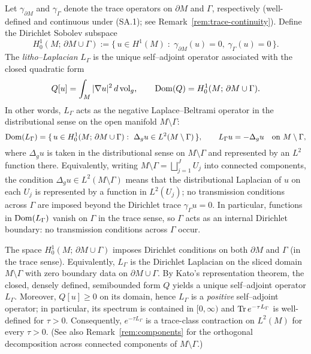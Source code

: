 \begin{definition}\label{def:litho-Laplacian}
Let $\gamma_{\partial M}$ and $\gamma_\Gamma$ denote the trace operators on $\partial M$ and $\Gamma$, respectively (well-defined and continuous under (SA.1); see Remark~\ref{rem:trace-continuity}).
Define the Dirichlet Sobolev subspace
\[
H^1_0(M;\,\partial M\cup\Gamma)
:= \{\, u\in H^1(M) \;:\; \gamma_{\partial M}(u)=0,\ \gamma_\Gamma(u)=0 \,\}.
\]
The \emph{litho–Laplacian} $L_\Gamma$ is the unique self–adjoint operator associated with the closed quadratic form
\[
Q[u] = \int_M |\nabla u|^2\,d\operatorname{vol}_g,\qquad \operatorname{Dom}(Q)=H^1_0(M;\,\partial M\cup\Gamma).
\]
In other words, $L_\Gamma$ acts as the negative Laplace–Beltrami operator in the distributional sense on the open manifold $M\setminus\Gamma$:
\[
\operatorname{Dom}(L_\Gamma)=\{\,u\in H^1_0(M;\,\partial M\cup\Gamma):\ \Delta_g u \in L^2(M\setminus\Gamma)\,\},\qquad
L_\Gamma u=-\Delta_g u \quad \text{on } M\setminus\Gamma,
\]
where $\Delta_g u$ is taken in the distributional sense on $M\setminus\Gamma$ and represented by an $L^2$ function there.
Equivalently, writing $M\setminus\Gamma=\bigsqcup_{j=1}^J U_j$ into connected components, the condition $\Delta_g u\in L^2(M\setminus\Gamma)$ means that the distributional Laplacian of $u$ on each $U_j$ is represented by a function in $L^2(U_j)$; no transmission conditions across $\Gamma$ are imposed beyond the Dirichlet trace $\gamma_\Gamma u=0$.
In particular, functions in $\operatorname{Dom}(L_\Gamma)$ vanish on $\Gamma$ in the trace sense, so $\Gamma$ acts as an internal Dirichlet boundary: no transmission conditions across $\Gamma$ occur.
\end{definition}

\begin{remark}\label{rem:Dirichlet-on-cut}
The space $H^1_0(M;\,\partial M\cup\Gamma)$ imposes Dirichlet conditions on both $\partial M$ and $\Gamma$ (in the trace sense).
Equivalently, $L_\Gamma$ is the Dirichlet Laplacian on the sliced domain $M\setminus\Gamma$ with zero boundary data on $\partial M\cup \Gamma$.
By Kato's representation theorem, the closed, densely defined, semibounded form $Q$ yields a unique self–adjoint operator $L_\Gamma$.
Moreover, $Q[u]\ge 0$ on its domain, hence $L_\Gamma$ is a \emph{positive} self–adjoint operator; in particular, its spectrum is contained in $[0,\infty)$ and $\operatorname{Tr} e^{-\tau L_\Gamma}$ is well-defined for $\tau>0$.
Consequently, $e^{-\tau L_\Gamma}$ is a trace-class contraction on $L^2(M)$ for every $\tau>0$.
(See also Remark~\ref{rem:components} for the orthogonal decomposition across connected components of $M\setminus\Gamma$.)
\end{remark}

